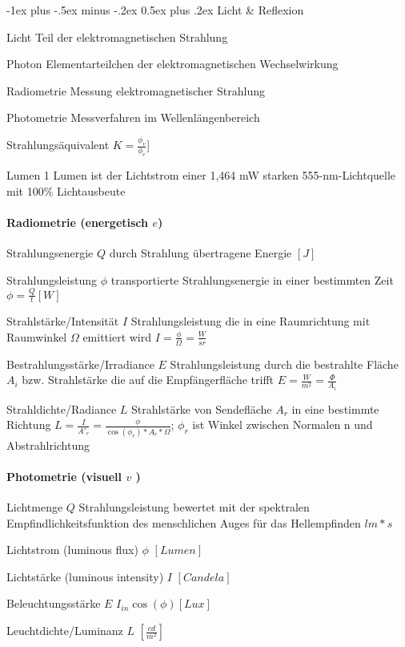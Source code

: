 \documentclass[landscape]{article}
\makeatletter
\renewcommand{\section}{\@startsection{section}{1}{0mm}%
                                {-1ex plus -.5ex minus -.2ex}%
                                {0.5ex plus .2ex}%
                                {\normalfont\large\bfseries}}
\makeatother
\begin{document}
\begin{multicols}{3}
  \section{Licht \& Reflexion}
  \begin{description*}
    \item[Licht] Teil der elektromagnetischen Strahlung
    \item[Photon] Elementarteilchen der elektromagnetischen Wechselwirkung
    \item[Radiometrie] Messung elektromagnetischer Strahlung
    \item[Photometrie] Messverfahren im Wellenlängenbereich
    \item[Strahlungsäquivalent] $K =\frac{\phi_v}{\phi_e}$]
    \item[Lumen] 1 Lumen ist der Lichtstrom einer 1,464 mW starken 555-nm-Lichtquelle mit 100\% Lichtausbeute
  \end{description*}
  
  \paragraph{Radiometrie (energetisch $e$) }
  \begin{description*}
    \item[Strahlungsenergie $Q$] durch Strahlung übertragene Energie $[J]$
    \item[Strahlungsleistung $\phi$] transportierte Strahlungsenergie in einer bestimmten Zeit $\phi = \frac{Q}{t} [W]$
    \item[Strahlstärke/Intensität $I$] Strahlungsleistung die in eine Raumrichtung mit Raumwinkel $\Omega$ emittiert wird $I=\frac{\phi}{\Omega}=\frac{W}{sr}$
    \item[Bestrahlungsstärke/Irradiance $E$] Strahlungsleistung durch die bestrahlte Fläche $A_i$ bzw. Strahlstärke die auf die Empfängerfläche trifft $E=\frac{W}{m^2}=\frac{\Phi}{A_i}$
    \item[Strahldichte/Radiance $L$] Strahlstärke von Sendefläche $A_r$ in eine bestimmte Richtung $L = \frac{I}{A'_r} = \frac{\phi}{\cos(\phi_r)*A_r*\Omega}$; $\phi_r$ ist Winkel zwischen Normalen n und Abstrahlrichtung
  \end{description*}
  
  \paragraph{Photometrie (visuell $v$ )}
  \begin{description*}
    \item[Lichtmenge $Q$] Strahlungsleistung bewertet mit der spektralen Empfindlichkeitsfunktion des menschlichen Auges für das Hellempfinden $lm*s$
    \item[Lichtstrom (luminous flux) $\phi$] $[Lumen]$
    \item[Lichtstärke (luminous intensity) $I$] $[Candela]$
    \item[Beleuchtungsstärke $E$] $I_{in}\cos(\phi) [Lux]$
    \item[Leuchtdichte/Luminanz $L$] $[\frac{cd}{m^2}]$
  \end{description*}
  

\end{multicols}
\end{document}
